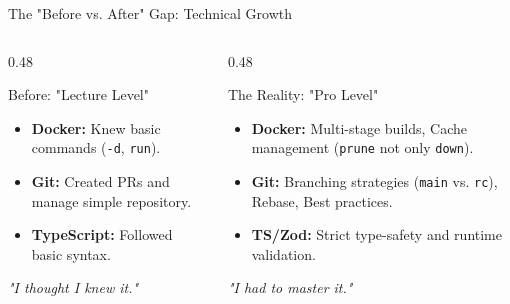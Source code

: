 \documentclass[11pt]{beamer}
\begin{document}
\begin{frame}{The "Before vs. After" Gap: Technical Growth}
    \begin{columns}[t]
        \begin{column}{0.48\textwidth}
            \begin{block}{Before: "Lecture Level"}
                \small
                \begin{itemize}
                    \item \textbf{Docker:} Knew basic commands (\texttt{-d}, \texttt{run}).
                    \item \textbf{Git:} Created PRs and manage simple repository.
                    \item \textbf{TypeScript:} Followed basic syntax.
                \end{itemize}
                \centering \textit{"I thought I knew it."}
            \end{block}
        \end{column}
        \begin{column}{0.48\textwidth}
            \begin{alertblock}{The Reality: "Pro Level"}
                \small
                \begin{itemize}
                    \item \textbf{Docker:} Multi-stage builds, Cache management (\texttt{prune} not only \texttt{down}).
                    \item \textbf{Git:} Branching strategies (\texttt{main} vs. \texttt{rc}), Rebase, Best practices.
                    \item \textbf{TS/Zod:} Strict type-safety and runtime validation.
                \end{itemize}
                \centering \textit{"I had to master it."}
            \end{alertblock}
        \end{column}
    \end{columns}
\end{frame}
\end{document}
